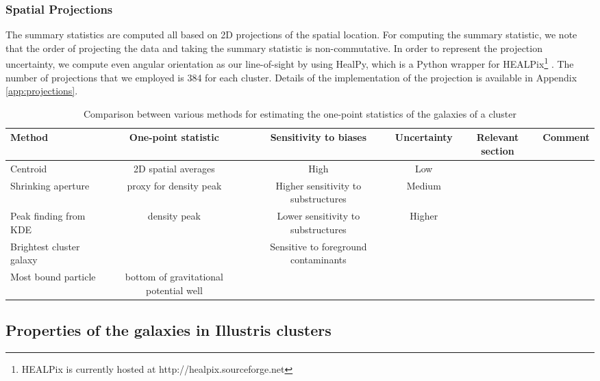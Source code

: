 \subsubsection{Spatial Projections}
The summary statistics are computed all based on 2D projections of the
spatial location.
For computing the summary statistic, we note that 
the order of projecting the data and taking the summary statistic is
non-commutative.  
In order to represent the projection uncertainty, we compute even angular
orientation as our line-of-sight
by using HealPy, which is a Python wrapper for HEALPix\footnote{HEALPix is
currently hosted at http://healpix.sourceforge.net}
\citep{Gorski2005}. 
The number of projections that we employed is 384 for each cluster.
Details of the implementation of the projection is available in Appendix
\ref{app:projections}.

\begin{table*}
\begin{center}
\begin{minipage}{180mm} 
	\caption{Comparison between various methods for estimating the one-point
		statistics of the galaxies of a cluster 
\label{tab:centroid_comparison}} 
	\begin{tabular}{@{}lccccc@{}}
\hline 
Method &  One-point statistic & Sensitivity to biases & Uncertainty  & Relevant
section & Comment  \\ \hline
Centroid & 2D spatial averages & High & Low & \\
Shrinking aperture & proxy for density peak & Higher sensitivity to substructures & Medium
& \\
Peak finding from KDE & density peak & Lower sensitivity to substructures &
Higher & \\
Brightest cluster galaxy & & Sensitive to foreground contaminants & \\ 
Most bound particle & bottom of gravitational potential well &  & 
&  \\
\hline
\end{tabular} 
\label{tab:summary_stat_info} 
\end{minipage}
\end{center} 
\end{table*}
\subsection{Properties of the galaxies in Illustris clusters}
